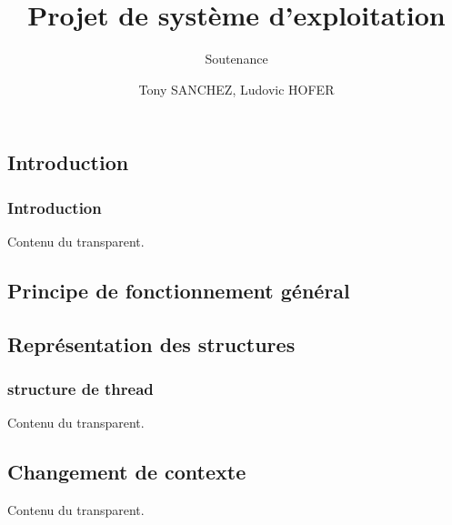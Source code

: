 \documentclass{beamer}
\title{Projet de système d'exploitation}
\subtitle{Soutenance}
\author{Tony SANCHEZ, Ludovic HOFER}
\institute{ENSERIB-MATMECA}
\begin{document}
 
\maketitle

\tableofcontents
 
\begin{frame} %
\section{Introduction}
\frametitle{Introduction}
 
Contenu du transparent.
 
\end{frame}

\begin{frame} %
\section{Principe de fonctionnement général}
\subsection{Représentation des structures}
\frametitle{structure de thread}
 
Contenu du transparent.
 
\end{frame}

\begin{frame} %
\subsection{Changement de contexte}
 
Contenu du transparent.
 
\end{frame}



 
\end{document}
